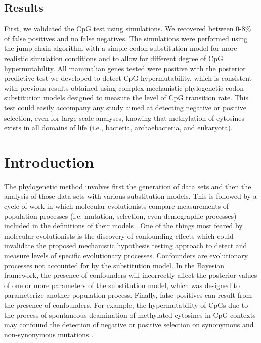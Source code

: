 \documentclass{article}
\begin{document}
\subsection*{Results}
First, we validated the CpG test using simulations. We recovered between 0-8\% of false positives and no false negatives. The simulations were performed using the jump-chain algorithm with a simple codon substitution model for more realistic simulation conditions and to allow for different degree of CpG hypermutability. All mammalian genes tested were positive with the posterior predictive test we developed to detect CpG hypermutability, which is consistent with previous results obtained using complex mechanistic phylogenetic codon substitution models designed to measure the level of CpG transition rate.  This test could easily accompany any study aimed at detecting negative or positive selection, even for large-scale analyses, knowing that methylation of cytosines exists in all domains of life (i.e., bacteria, archaebacteria, and eukaryota).

\clearpage
\linenumbers
\section*{Introduction}
The phylogenetic method involves first the generation of data sets and then the analysis of those data sets with various substitution models.  This is followed by a cycle of work in which molecular evolutionists compare measurements of population processes (i.e. mutation, selection, even demographic processes) included in the definitions of their models \citep[e.g.][]{Rodrigue2020,Latrille2021a}.  One of the things most feared by molecular evolutionists is the discovery of confounding effects \citep[e.g.,][]{LaurinLemay2018a,LaurinLemay2022} which could invalidate the proposed mechanistic hypothesis testing approach to detect and measure levels of specific evolutionary processes.  Confounders are evolutionary processes not accounted for by the substitution model.  In the Bayesian framework, the presence of confounders will incorrectly affect the posterior values of one or more parameters of the substitution model, which was designed to parameterize another population process.  Finally, false positives can result from the presence of confounders.  For example, the hypermutability of CpGs due to the process of spontaneous deamination of methylated cytosines in CpG contexts may confound the detection of negative or positive selection on synonymous and non-synonymous mutations \citep[e.g.,][]{LaurinLemay2018a,LaurinLemay2022}.
\end{document}
